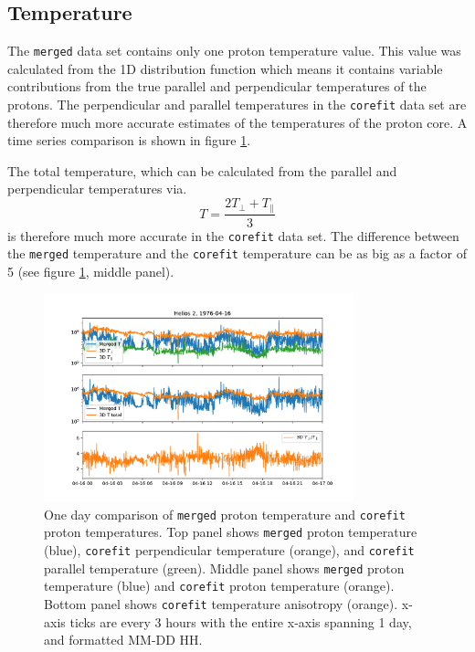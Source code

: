 \documentclass[11pt,a4paper]{article}
\begin{document}
\subsection{Temperature}
The \texttt{merged} data set contains only one proton temperature value. This value was calculated from the 1D distribution function which means it contains variable contributions from the true parallel and perpendicular temperatures of the protons. The perpendicular and parallel temperatures in the \texttt{corefit} data set are therefore much more accurate estimates of the temperatures of the proton core. A time series comparison is shown in figure \ref{fig:temperature}.

The total temperature, which can be calculated from the parallel and perpendicular temperatures via.
\begin{equation}
	T = \frac{2T_{\perp} + T_{\parallel}}{3}
\end{equation}
is therefore much more accurate in the \texttt{corefit} data set. The difference between the \texttt{merged} temperature and the \texttt{corefit} temperature can be as big as a factor of 5 (see figure \ref{fig:temperature}, middle panel).

\begin{figure}
	\centering
	\includegraphics[width=0.8\textwidth]{temperature_comparision}
	\caption{One day comparison of \texttt{merged} proton temperature and \texttt{corefit} proton temperatures. Top panel shows \texttt{merged} proton temperature (blue), \texttt{corefit} perpendicular temperature (orange), and \texttt{corefit} parallel temperature (green). Middle panel shows \texttt{merged} proton temperature (blue) and \texttt{corefit} proton temperature (orange). Bottom panel shows \texttt{corefit} temperature anisotropy (orange). x-axis ticks are every 3 hours with the entire x-axis spanning 1 day, and formatted MM-DD HH.}
	\label{fig:temperature}
\end{figure}
\end{document}
